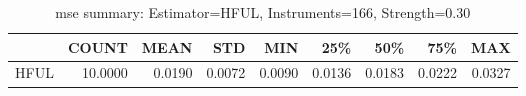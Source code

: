 \begin{table}[ht]
\centering
\caption{mse summary: Estimator=HFUL, Instruments=166, Strength=0.30}
\begin{tabular}{lrrrrrrrr}
\toprule
 & COUNT & MEAN & STD & MIN & 25\% & 50\% & 75\% & MAX \\
\midrule
HFUL & 10.0000 & 0.0190 & 0.0072 & 0.0090 & 0.0136 & 0.0183 & 0.0222 & 0.0327 \\
\bottomrule
\end{tabular}
\end{table}
